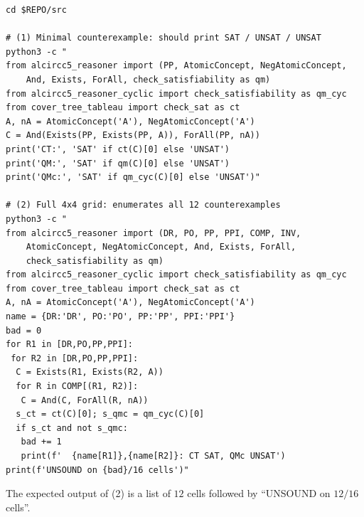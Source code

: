 \documentclass[]{ceurart}
\theoremstyle{definition}
\theoremstyle{remark}
\begin{document}
\begin{lstlisting}[basicstyle=\ttfamily\footnotesize]
cd $REPO/src

# (1) Minimal counterexample: should print SAT / UNSAT / UNSAT
python3 -c "
from alcircc5_reasoner import (PP, AtomicConcept, NegAtomicConcept,
    And, Exists, ForAll, check_satisfiability as qm)
from alcircc5_reasoner_cyclic import check_satisfiability as qm_cyc
from cover_tree_tableau import check_sat as ct
A, nA = AtomicConcept('A'), NegAtomicConcept('A')
C = And(Exists(PP, Exists(PP, A)), ForAll(PP, nA))
print('CT:', 'SAT' if ct(C)[0] else 'UNSAT')
print('QM:', 'SAT' if qm(C)[0] else 'UNSAT')
print('QMc:', 'SAT' if qm_cyc(C)[0] else 'UNSAT')"

# (2) Full 4x4 grid: enumerates all 12 counterexamples
python3 -c "
from alcircc5_reasoner import (DR, PO, PP, PPI, COMP, INV,
    AtomicConcept, NegAtomicConcept, And, Exists, ForAll,
    check_satisfiability as qm)
from alcircc5_reasoner_cyclic import check_satisfiability as qm_cyc
from cover_tree_tableau import check_sat as ct
A, nA = AtomicConcept('A'), NegAtomicConcept('A')
name = {DR:'DR', PO:'PO', PP:'PP', PPI:'PPI'}
bad = 0
for R1 in [DR,PO,PP,PPI]:
 for R2 in [DR,PO,PP,PPI]:
  C = Exists(R1, Exists(R2, A))
  for R in COMP[(R1, R2)]:
   C = And(C, ForAll(R, nA))
  s_ct = ct(C)[0]; s_qmc = qm_cyc(C)[0]
  if s_ct and not s_qmc:
   bad += 1
   print(f'  {name[R1]},{name[R2]}: CT SAT, QMc UNSAT')
print(f'UNSOUND on {bad}/16 cells')"
\end{lstlisting}

The expected output of (2) is a list of $12$ cells followed by
``UNSOUND on $12/16$ cells''.
\end{document}
